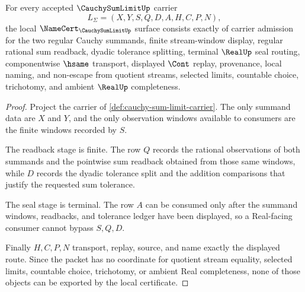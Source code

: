 \begin{theorem}
\label{thm:cauchy-sum-limit-namecert-obligations}
For every accepted $\CauchySumLimitUp$ carrier
$$
L_{\Sigma}=(X,Y,S,Q,D,A,H,C,P,N),
$$
the local $\NameCert_{\CauchySumLimitUp}$ surface consists exactly of carrier admission for the two regular Cauchy summands, finite stream-window display, regular rational sum readback, dyadic tolerance splitting, terminal $\RealUp$ seal routing, componentwise $\hsame$ transport, displayed $\Cont$ replay, provenance, local naming, and non-escape from quotient streams, selected limits, countable choice, trichotomy, and ambient $\RealUp$ completeness.
\end{theorem}
\begin{proof}
Project the carrier of \autoref{def:cauchy-sum-limit-carrier}. The only summand data are $X$ and $Y$, and the only observation windows available to consumers are the finite windows recorded by $S$.

The readback stage is finite. The row $Q$ records the rational observations of both summands and the pointwise sum readback obtained from those same windows, while $D$ records the dyadic tolerance split and the addition comparisons that justify the requested sum tolerance.

The seal stage is terminal. The row $A$ can be consumed only after the summand windows, readbacks, and tolerance ledger have been displayed, so a Real-facing consumer cannot bypass $S,Q,D$.

Finally $H,C,P,N$ transport, replay, source, and name exactly the displayed route. Since the packet has no coordinate for quotient stream equality, selected limits, countable choice, trichotomy, or ambient Real completeness, none of those objects can be exported by the local certificate.
\end{proof}

